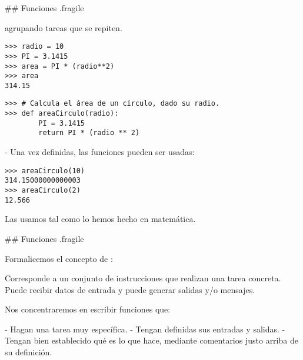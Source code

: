 \trmcolumns

## Funciones {.fragile}

\bgnblocknormal[wd=.8\textwidth,centered=true]
 agrupando tareas que se repiten.
\trmblocknormal

\bgncolumns


\begin{lstlisting}
>>> radio = 10
>>> PI = 3.1415
>>> area = PI * (radio**2)
>>> area
314.15
\end{lstlisting}


\begin{lstlisting}[style=frame01]
>>> # Calcula el área de un círculo, dado su radio.
>>> def areaCirculo(radio):
        PI = 3.1415
        return PI * (radio ** 2)
\end{lstlisting}

\trmcolumns

\pause

- Una vez definidas, las funciones pueden ser usadas:

\bgncolumns

\begin{lstlisting}
>>> areaCirculo(10)
314.15000000000003
>>> areaCirculo(2)
12.566
\end{lstlisting}


\bgnblocknormal[wd=.9\textwidth,centered=true]
Las usamos tal como lo hemos hecho en matemática.
\trmblocknormal

\trmcolumns

## Funciones {.fragile}

Formalicemos el concepto de :

\vfill
\bgnblockdefinition
{} Corresponde a un conjunto de instrucciones que realizan una tarea concreta.
Puede recibir datos de entrada y puede generar salidas y/o mensajes.
\trmblockdefinition

\vfill

Nos concentraremos en escribir funciones que:

- Hagan una tarea muy específica.
- Tengan definidas sus entradas y salidas.
- Tengan bien establecido qué es lo que hace, mediante comentarios justo arriba de
su definición.


